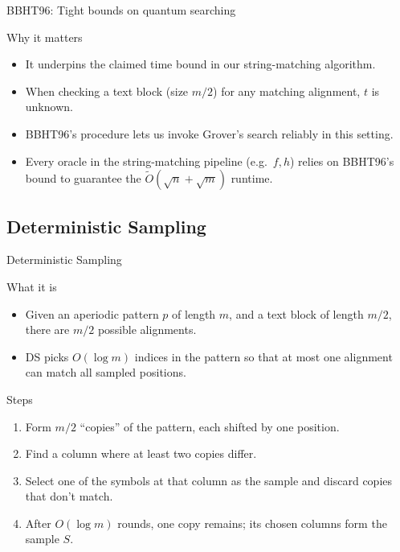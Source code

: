 \documentclass{beamer}
\begin{document}
\begin{frame}{BBHT96: Tight bounds on quantum searching}

    \begin{block}{Why it matters}
        \begin{itemize}
            \item It underpins the claimed time bound in our string-matching algorithm.
            \item When checking a text block (size \(m/2\)) for any matching alignment, \(t\) is unknown.
            \item BBHT96's procedure lets us invoke Grover's search reliably in this setting.
            \item Every oracle in the string-matching pipeline (e.g.\ \(f, h\)) relies on BBHT96's bound
                  to guarantee the \(\tilde O(\sqrt n + \sqrt m)\) runtime.
        \end{itemize}
    \end{block}
\end{frame}


\subsection{Deterministic Sampling}
\begin{frame}{Deterministic Sampling}
    \begin{block}{What it is}
        \begin{itemize}
            \item Given an aperiodic pattern \(p\) of length \(m\), and a text block of length \(m/2\), there are \(m/2\) possible alignments.
            \item DS picks \(O(\log m)\) indices in the pattern so that at most one alignment can match all sampled positions.
        \end{itemize}
    \end{block}

    \begin{block}{Steps}
        \begin{enumerate}
            \item Form \(m/2\) ``copies'' of the pattern, each shifted by one position.
            \item Find a column where at least two copies differ.
            \item Select one of the symbols at that column as the sample and discard copies that don't match.
            \item After \(O(\log m)\) rounds, one copy remains; its chosen columns form the sample \(S\).
        \end{enumerate}
    \end{block}

\end{frame}
\end{document}
